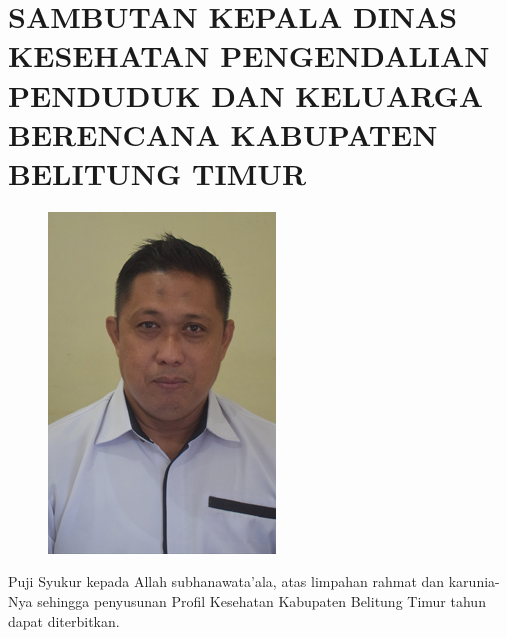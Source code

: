{}
\section*{SAMBUTAN KEPALA DINAS KESEHATAN PENGENDALIAN PENDUDUK DAN KELUARGA BERENCANA KABUPATEN BELITUNG TIMUR}
\begingroup
\setlength\intextsep{0pt}
\begin{figure}
    \centering
    \includegraphics[width=0.98\linewidth]{preamble_fotoKadin}
\end{figure}

Puji Syukur kepada Allah subhanawata'ala, atas limpahan rahmat dan  karunia-Nya sehingga penyusunan Profil Kesehatan Kabupaten Belitung Timur tahun \tPnos{} dapat diterbitkan.

